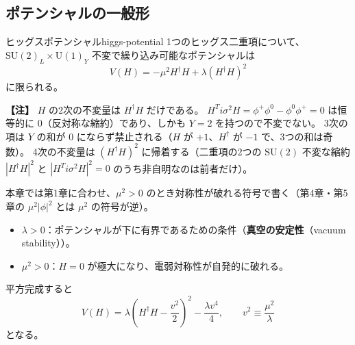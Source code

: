 \documentclass[uplatex,dvipdfmx,a4paper,11pt,openany]{jsbook}
\newcommand{\term}[2]{\textbf{#1}（#2）}
\newenvironment{note}{\vspace{1ex}\par\footnotesize\noindent\textbf{【注】}}{\par\vspace{1ex}}
\numberwithin{equation}{chapter}
\theoremstyle{definition}
\theoremstyle{plain}
\theoremstyle{remark}
\newcommand{\SU}{\mathrm{SU}}
\newcommand{\U}{\mathrm{U}}
\begin{document}
\subsection{ポテンシャルの一般形}
\begin{myprop}{ヒッグスポテンシャル}{higgs-potential}
1つのヒッグス二重項について、$\SU(2)_L\times\U(1)_Y$ 不変で繰り込み可能なポテンシャルは
\begin{equation}
V(H)=-\mu^2H^\dagger H+\lambda\left(H^\dagger H\right)^2
\label{eq:higgs-potential}
\end{equation}
に限られる。
\end{myprop}
\begin{note}
$H$ の2次の不変量は $H^\dagger H$ だけである。
$H^Ti\sigma^2H=\phi^+\phi^0-\phi^0\phi^+=0$ は恒等的に 0（反対称な縮約）であり、しかも $Y=2$ を持つので不変でない。
3次の項は $Y$ の和が 0 にならず禁止される（$H$ が $+1$、$H^\dagger$ が $-1$ で、3つの和は奇数）。
4次の不変量は $(H^\dagger H)^2$ に帰着する（二重項の2つの $\SU(2)$ 不変な縮約 $|H^\dagger H|^2$ と $|H^Ti\sigma^2H|^2=0$ のうち非自明なのは前者だけ）。
\end{note}
本章では第1章に合わせ、$\mu^2>0$ のとき対称性が破れる符号で書く（第4章・第5章の $\mu^2|\phi|^2$ とは $\mu^2$ の符号が逆）。
\begin{itemize}
    \item $\lambda>0$：ポテンシャルが下に有界であるための条件（\term{真空の安定性}{vacuum stability}）。
    \item $\mu^2>0$：$H=0$ が極大になり、電弱対称性が自発的に破れる。
\end{itemize}
平方完成すると
\begin{equation}
V(H)=\lambda\left(H^\dagger H-\frac{v^2}{2}\right)^2-\frac{\lambda v^4}{4},
\qquad v^2\equiv\frac{\mu^2}{\lambda}
\label{eq:higgs-potential-square}
\end{equation}
となる。
\end{document}
